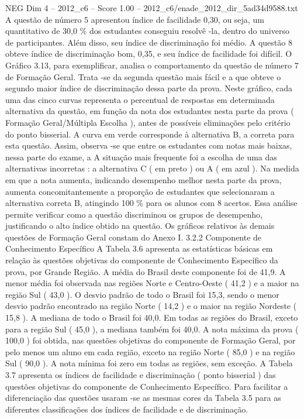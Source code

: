 \begin{textsample}{NEG Dim 4 – 2012\_c6 – Score 1.00 – 2012\_c6/enade\_2012\_dir\_5ad34d9588.txt}
A questão de número 5 apresentou índice de facilidade 0,30, ou seja, um quantitativo de 30,0 \% dos estudantes conseguiu resolvê -la, dentro do universo de participantes.
Além disso, seu índice de discriminação foi médio.
A questão 8 obteve índice de discriminação bom, 0,35, e seu índice de facilidade foi difícil.
O Gráfico 3.13, para exemplificar, analisa o comportamento da questão de número 7 de Formação Geral.
Trata -se da segunda questão mais fácil e a que obteve o segundo maior índice de discriminação dessa parte da prova.
Neste gráfico, cada uma das cinco curvas representa o percentual de respostas em determinada alternativa da questão, em função da nota dos estudantes nesta parte da prova ( Formação Geral/Múltipla Escolha ), antes de possíveis eliminações pelo critério do ponto bisserial.
A curva em verde corresponde à alternativa B, a correta para esta questão.
Assim, observa -se que entre os estudantes com notas mais baixas, nessa parte do exame, a A situação mais frequente foi a escolha de uma das alternativas incorretas : a alternativa C ( em preto ) ou A ( em azul ).
Na medida em que a nota aumenta, indicando desempenho melhor nesta parte da prova, aumenta concomitantemente a proporção de estudantes que selecionaram a alternativa correta B, atingindo 100 \% para os alunos com 8 acertos.
Essa análise permite verificar como a questão discriminou os grupos de desempenho, justificando o alto índice obtido na questão.
Os gráficos relativos às demais questões de Formação Geral constam do Anexo I. 3.2.2 Componente de Conhecimento Específico A Tabela 3.6 apresenta as estatísticas básicas em relação às questões objetivas do componente de Conhecimento Específico da prova, por Grande Região.
A média do Brasil deste componente foi de 41,9.
A menor média foi observada nas regiões Norte e Centro-Oeste ( 41,2 ) e a maior na região Sul ( 43,0 ).
O desvio padrão de todo o Brasil foi 15,3, sendo o menor desvio padrão encontrado na região Norte ( 14,2 ) e o maior na região Nordeste ( 15,8 ).
A mediana de todo o Brasil foi 40,0.
Em todas as regiões do Brasil, exceto para a região Sul ( 45,0 ), a mediana também foi 40,0.
A nota máxima da prova ( 100,0 ) foi obtida, nas questões objetivas do componente de Formação Geral, por pelo menos um aluno em cada região, exceto na região Norte ( 85,0 ) e na região Sul ( 90,0 ).
A nota mínima foi zero em todas as regiões, sem exceção.
A Tabela 3.7 apresenta os índices de facilidade e discriminação ( ponto bisserial ) das questões objetivas do componente de Conhecimento Específico.
Para facilitar a diferenciação das questões usaram -se as mesmas cores da Tabela 3.5 para as diferentes classificações dos índices de facilidade e de discriminação.

\end{textsample}
